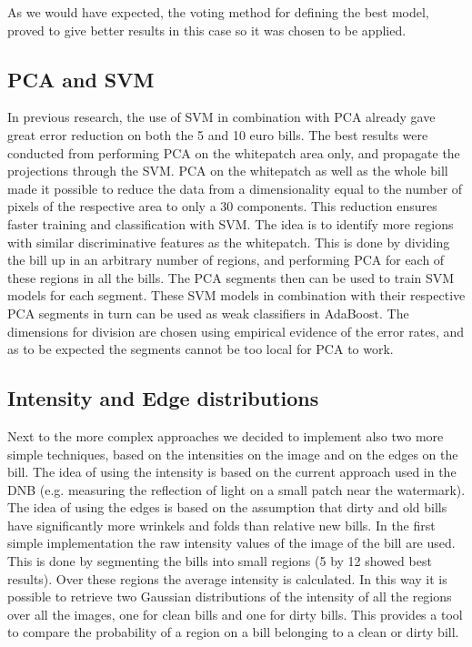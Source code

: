 \documentclass[11pt,twocolumn]{article}
\begin{document}
			As we would have expected, the voting method for defining the best model, proved to give better results in this case so it was chosen to be applied.

		\subsection{PCA and SVM}\label{sec:PCA}
			In previous research, the use of SVM in combination with PCA already gave great error reduction on both the 5 and 10 euro bills. The best results were conducted from performing PCA on the whitepatch area only, and propagate the projections through the SVM. PCA on the whitepatch as well as the whole bill made it possible to reduce the data from a dimensionality equal to the number of pixels of the respective area to only a 30 components. This reduction ensures faster training and classification with SVM. The idea is to identify more regions with similar discriminative features as the whitepatch. This is done by dividing the bill up in an arbitrary number of regions, and performing PCA for each of these regions in all the bills. The PCA segments then can be used to train SVM models for each segment. These SVM models in combination with their respective PCA segments in turn can be used as weak classifiers in AdaBoost. The dimensions for division are chosen using empirical evidence of the error rates, and as to be expected the segments cannot be too local for PCA to work.

		\subsection{Intensity and Edge distributions}\label{sec:Intensity_Edge}
			Next to the more complex approaches we decided to implement	also two more simple techniques, based on the intensities on the image and on the edges on the bill. The idea of using the intensity is based on	the current approach used in the DNB (e.g. measuring the reflection of light on a small patch near the watermark). The idea of using the edges is based on the assumption that dirty and old	bills have significantly more wrinkels and folds than relative new bills. In the first simple implementation the raw intensity values of the image of the bill are used. This is done by segmenting the bills into small regions (5 by 12 showed best results). Over these regions the average intensity is calculated. In this way it is possible to retrieve two Gaussian distributions	of the intensity of all the regions over all the images, one for clean bills and one for dirty bills. This provides a tool to compare the probability of a region on a bill belonging to a clean or dirty bill.
			
\end{document}

